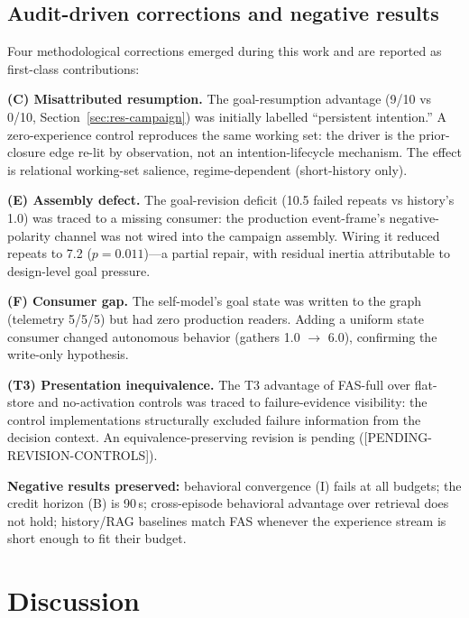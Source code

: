 \documentclass[10pt,a4paper]{article}
\begin{document}
\subsection{Audit-driven corrections and negative results}
\label{sec:audit-negative}

Four methodological corrections emerged during this work and are
reported as first-class contributions:

\textbf{(C) Misattributed resumption.} The goal-resumption advantage
(9/10 vs 0/10, Section~\ref{sec:res-campaign}) was initially labelled
``persistent intention.'' A zero-experience control reproduces the same
working set: the driver is the prior-closure edge re-lit by observation,
not an intention-lifecycle mechanism. The effect is relational
working-set salience, regime-dependent (short-history only).

\textbf{(E) Assembly defect.} The goal-revision deficit (10.5 failed
repeats vs history's 1.0) was traced to a missing consumer: the
production event-frame's negative-polarity channel was not wired into
the campaign assembly. Wiring it reduced repeats to 7.2
($p{=}0.011$)---a partial repair, with residual inertia attributable
to design-level goal pressure.

\textbf{(F) Consumer gap.} The self-model's goal state was written to
the graph (telemetry 5/5/5) but had zero production readers. Adding a
uniform state consumer changed autonomous behavior (gathers 1.0
$\rightarrow$ 6.0), confirming the write-only hypothesis.

\textbf{(T3) Presentation inequivalence.} The T3 advantage of FAS-full
over flat-store and no-activation controls was traced to
failure-evidence visibility: the control implementations structurally
excluded failure information from the decision context. An
equivalence-preserving revision is pending ([PENDING-REVISION-CONTROLS]).

\textbf{Negative results preserved:} behavioral convergence (I) fails
at all budgets; the credit horizon (B) is 90\,s; cross-episode
behavioral advantage over retrieval does not hold; history/RAG
baselines match FAS whenever the experience stream is short enough to
fit their budget.

\section{Discussion}
\label{sec:discussion}
\end{document}
